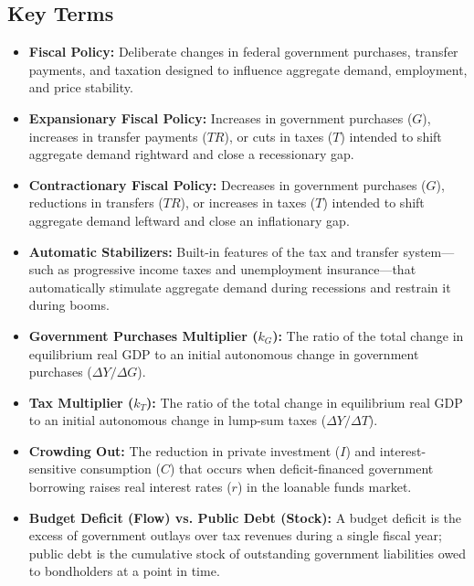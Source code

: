 \documentclass[11pt,letterpaper]{article}
\begin{document}
\subsection*{Key Terms}
\begin{itemize}[leftmargin=1.5em]
    \item \textbf{Fiscal Policy:} Deliberate changes in federal government purchases, transfer payments, and taxation designed to influence aggregate demand, employment, and price stability.
    \item \textbf{Expansionary Fiscal Policy:} Increases in government purchases ($G$), increases in transfer payments ($TR$), or cuts in taxes ($T$) intended to shift aggregate demand rightward and close a recessionary gap.
    \item \textbf{Contractionary Fiscal Policy:} Decreases in government purchases ($G$), reductions in transfers ($TR$), or increases in taxes ($T$) intended to shift aggregate demand leftward and close an inflationary gap.
    \item \textbf{Automatic Stabilizers:} Built-in features of the tax and transfer system---such as progressive income taxes and unemployment insurance---that automatically stimulate aggregate demand during recessions and restrain it during booms.
    \item \textbf{Government Purchases Multiplier ($k_G$):} The ratio of the total change in equilibrium real GDP to an initial autonomous change in government purchases ($\Delta Y / \Delta G$).
    \item \textbf{Tax Multiplier ($k_T$):} The ratio of the total change in equilibrium real GDP to an initial autonomous change in lump-sum taxes ($\Delta Y / \Delta T$).
    \item \textbf{Crowding Out:} The reduction in private investment ($I$) and interest-sensitive consumption ($C$) that occurs when deficit-financed government borrowing raises real interest rates ($r$) in the loanable funds market.
    \item \textbf{Budget Deficit (Flow) vs. Public Debt (Stock):} A budget deficit is the excess of government outlays over tax revenues during a single fiscal year; public debt is the cumulative stock of outstanding government liabilities owed to bondholders at a point in time.
\end{itemize}
\end{document}
